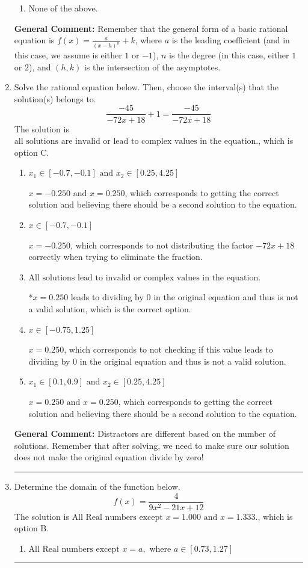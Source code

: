 \documentclass{extbook}[14pt]
\newcommand{\litem}[1]{\item #1

\rule{\textwidth}{0.4pt}}
\begin{document}
\begin{enumerate}
{\begin{enumerate}[label=\Alph*.]
\begin{multicols}{2}
\end{multicols}\item None of the above.\end{enumerate}
\textbf{General Comment:} Remember that the general form of a basic rational equation is $ f(x) = \frac{a}{(x-h)^n} + k$, where $a$ is the leading coefficient (and in this case, we assume is either $1$ or $-1$), $n$ is the degree (in this case, either $1$ or $2$), and $(h, k)$ is the intersection of the asymptotes.
}
\litem{
Solve the rational equation below. Then, choose the interval(s) that the solution(s) belongs to.
\[ \frac{-45}{-72x + 18} + 1 = \frac{-45}{-72x + 18} \]The solution is \( \text{all solutions are invalid or lead to complex values in the equation.} \), which is option C.\begin{enumerate}[label=\Alph*.]
\item \( x_1 \in [-0.7, -0.1] \text{ and } x_2 \in [0.25,4.25] \)

$x = -0.250 \text{ and } x = 0.250$, which corresponds to getting the correct solution and believing there should be a second solution to the equation.
\item \( x \in [-0.7,-0.1] \)

$x = -0.250$, which corresponds to not distributing the factor $-72x + 18$ correctly when trying to eliminate the fraction.
\item \( \text{All solutions lead to invalid or complex values in the equation.} \)

*$x = 0.250$ leads to dividing by 0 in the original equation and thus is not a valid solution, which is the correct option.
\item \( x \in [-0.75,1.25] \)

$x = 0.250$, which corresponds to not checking if this value leads to dividing by 0 in the original equation and thus is not a valid solution.
\item \( x_1 \in [0.1, 0.9] \text{ and } x_2 \in [0.25,4.25] \)

$x = 0.250 \text{ and } x = 0.250$, which corresponds to getting the correct solution and believing there should be a second solution to the equation.
\end{enumerate}

\textbf{General Comment:} Distractors are different based on the number of solutions. Remember that after solving, we need to make sure our solution does not make the original equation divide by zero!
}
\litem{
Determine the domain of the function below.
\[ f(x) = \frac{4}{9x^{2} -21 x + 12} \]The solution is \( \text{All Real numbers except } x = 1.000 \text{ and } x = 1.333. \), which is option B.\begin{enumerate}[label=\Alph*.]
\item \( \text{All Real numbers except } x = a, \text{ where } a \in [0.73, 1.27] \)


\end{enumerate}}
\end{enumerate}
\end{document}
